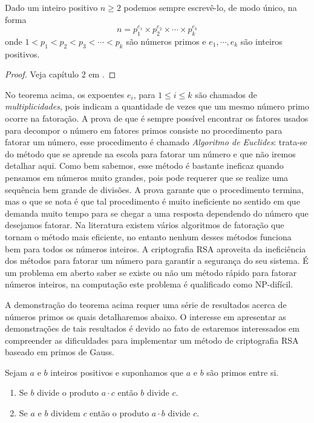 \begin{Th}
\label{fat.unica} 
Dado um inteiro positivo $n\geq 2$ podemos sempre escrev\^e-lo, de modo \'unico, na forma
$$n=p_{1}^{e_1}\times p_{2}^{e_2}\times\cdots\times p_{k}^{e_k}$$
onde $1<p_1<p_2<p_3<\cdots<p_k$ s\~ao n\'umeros primos e $e_1, \cdots, e_k$ s\~ao inteiros positivos.
\end{Th}
\begin{proof}
	Veja cap\'{i}tulo 2 em \cite{cou:2014}.
\end{proof}

No teorema acima, os expoentes $e_i$, para $1\leq i\leq k$ s\~ao chamados de \textit{multiplicidades}, pois indicam a quantidade de vezes que um mesmo n\'umero primo ocorre na fatora\c{c}\~ao. A prova de que \'e sempre poss\'ivel encontrar os fatores usados para decompor o n\'umero em fatores primos consiste no procedimento para fatorar um n\'umero, esse procedimento \'e chamado \textit{Algoritmo de Euclides}: trata-se do m\'etodo que se aprende na escola para fatorar
um n\'umero e que n\~ao iremos detalhar aqui. Como bem sabemos, esse m\'etodo \'e bastante ineficaz quando pensamos em n\'umeros muito grandes, pois pode requerer que se realize uma sequ\^encia bem grande de divis\~oes. A prova garante que o procedimento termina, mas o que se nota \'e que tal procedimento \'e muito ineficiente no sentido em que demanda muito tempo para se chegar a uma resposta dependendo do n\'umero que desejamos fatorar. Na literatura existem v\'arios algoritmos de fatora\c{c}\~ao que tornam o m\'etodo mais eficiente, no entanto nenhum desses m\'etodos funciona bem para todos os n\'umeros inteiros. A criptografia RSA aproveita da inefici\^encia dos m\'etodos para fatorar um n\'umero para garantir a seguran\c{c}a do seu sistema. \'E um problema em aberto saber se existe ou n\~ao um m\'etodo r\'apido para fatorar n\'umeros inteiros, na computação este problema é qualificado como NP-difícil.  

A demonstra\c{c}\~ao do teorema acima requer uma s\'erie de resultados acerca de n\'umeros primos os quais detalharemos abaixo. O interesse em apresentar as demonstra\c{c}\~oes de tais resultados \'e devido ao fato de estaremos interessados em
compreender as dificuldades para implementar um m\'etodo de criptografia RSA baseado em primos de Gauss. 

\begin{Th}\label{propriedade_de_primos}
Sejam $a$ e $b$ inteiros positivos e suponhamos que $a$ e $b$ s\~ao primos entre si.
\begin{enumerate}
\item Se $b$ divide o produto $a\cdot c$ ent\~ao $b$ divide $c$.
\item Se $a$ e $b$ dividem $c$ ent\~ao o produto $a\cdot b$ divide $c$.
\end{enumerate}
\end{Th}

